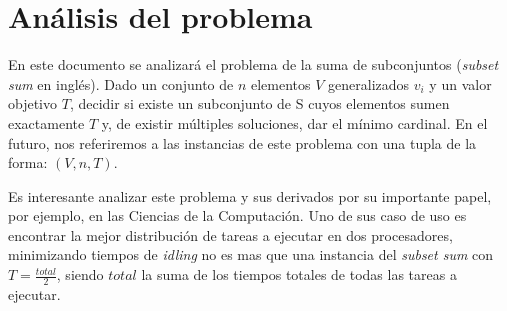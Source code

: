 \section{Análisis del problema}
En este documento se analizará el problema de la suma de subconjuntos (\textit{subset sum} en inglés). Dado un conjunto de $n$ elementos $V$ generalizados $v_{i}$ y un valor objetivo $T$, decidir si existe un subconjunto de S cuyos elementos sumen exactamente $T$ y, de existir múltiples soluciones, dar el mínimo cardinal. En el futuro, nos referiremos a las instancias de este problema con una tupla de la forma: $(V, n, T)$.

\vskip 8pt

Es interesante analizar este problema y sus derivados por su importante papel, por ejemplo, en las Ciencias de la Computación. Uno de sus caso de uso es encontrar la mejor distribución de tareas a ejecutar en dos procesadores, minimizando tiempos de \textit{idling} no es mas que una instancia del \textit{subset sum} con $T = \frac{total}{2}$, siendo $total$ la suma de los tiempos totales de todas las tareas a ejecutar.